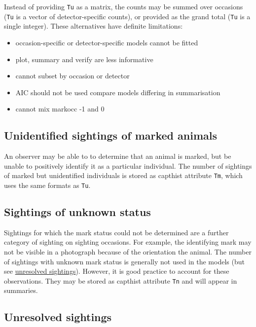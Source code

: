 \documentclass[
]{book}
\providecommand{\tightlist}{%
  \setlength{\itemsep}{0pt}\setlength{\parskip}{0pt}}
\begin{document}
Instead of providing \texttt{Tu} as a matrix, the counts may be summed over occasions (\texttt{Tu} is a vector of detector-specific counts), or provided as the grand total (\texttt{Tu} is a single integer). These alternatives have definite limitations:

\begin{itemize}
\tightlist
\item
  occasion-specific or detector-specific models cannot be fitted
\item
  plot, summary and verify are less informative
\item
  cannot subset by occasion or detector
\item
  AIC should not be used compare models differing in summarisation
\item
  cannot mix markocc -1 and 0
\end{itemize}

\subsection{Unidentified sightings of marked animals}\label{unidentified-sightings-of-marked-animals}

An observer may be able to to determine that an animal is marked, but be unable to positively identify it as a particular individual. The number of sightings of marked but unidentified individuals is stored as capthist attribute \texttt{Tm}, which uses the same formats as \texttt{Tu}.

\subsection{Sightings of unknown status}\label{sightings-of-unknown-status}

Sightings for which the mark status could not be determined are a further category of sighting on sighting occasions. For example, the identifying mark may not be visible in a photograph because of the orientation the animal. The number of sightings with unknown mark status is generally not used in the models (but see \hyperref[unresolvedsightings]{unresolved sightings}). However, it is good practice to account for these observations. They may be stored as capthist attribute \texttt{Tn} and will appear in summaries.

\subsection{Unresolved sightings}\label{unresolvedsightings}
\end{document}
